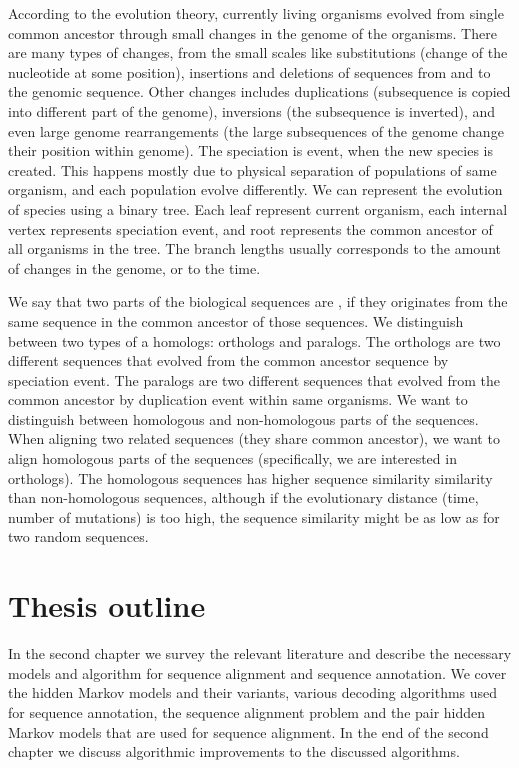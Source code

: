 According to the evolution theory, currently living organisms evolved from
single common ancestor through small changes in the genome of the organisms.
There are many types of changes, from the small scales like substitutions
(change of the nucleotide at some position), insertions and deletions of
sequences from and to the genomic sequence. Other changes includes duplications
(subsequence is copied into different part of the genome), inversions (the
subsequence is inverted), and even large genome rearrangements (the large
subsequences of the genome change their position within genome). The speciation
is event, when the new species is created. This happens mostly due to physical
separation of populations of same organism, and each population evolve
differently. We can represent the evolution of species using a binary tree.
Each leaf represent current organism, each internal vertex represents
speciation event, and root represents the common ancestor of all organisms in
the tree. The branch lengths usually corresponds to the amount of changes in
the genome, or to the time. 

We say that two parts of the biological sequences are ,
if they originates from the same sequence in the common ancestor of those
sequences. We distinguish between two types of a homologs: orthologs and
paralogs. The orthologs are two different sequences that evolved from the
common ancestor sequence by speciation event. The paralogs are two different
sequences that evolved from the common ancestor by duplication event within
same organisms. We want to distinguish between homologous and non-homologous
parts of the sequences. When aligning two related sequences (they share common
ancestor), we want to align homologous parts of the sequences (specifically, we
are interested in orthologs). The homologous sequences has higher sequence
similarity similarity than non-homologous sequences, although if the
evolutionary distance (time, number of mutations) is too high, the sequence
similarity might be as low as for two random sequences.

\section{Thesis outline}


In the second chapter we survey the relevant literature and describe the
necessary models and algorithm for sequence alignment and sequence annotation.
We cover the hidden Markov models and their variants, various decoding
algorithms used for sequence annotation, the sequence alignment problem and the
pair hidden Markov models that are used for sequence alignment.  In the end of
the second chapter we discuss algorithmic improvements to the discussed
algorithms.

